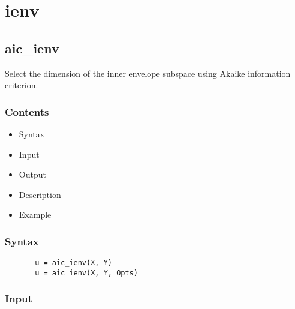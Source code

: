 \documentclass[a4paper,11pt,openany]{memoir}
\begin{document}
\newpage

\chapter{ienv}


\rmfamily
\color{black}\section{aic\_ienv}

\begin{par}
Select the dimension of the inner envelope subspace using Akaike information criterion.
\end{par} \vspace{1em}

\subsection*{Contents}

\begin{itemize}
\setlength{\itemsep}{-1ex}
   \item Syntax
   \item Input
   \item Output
   \item Description
   \item Example
\end{itemize}


\subsection*{Syntax}


\begin{verbatim}       u = aic_ienv(X, Y)
       u = aic_ienv(X, Y, Opts)\end{verbatim}
    

\subsection*{Input}
\end{document}
